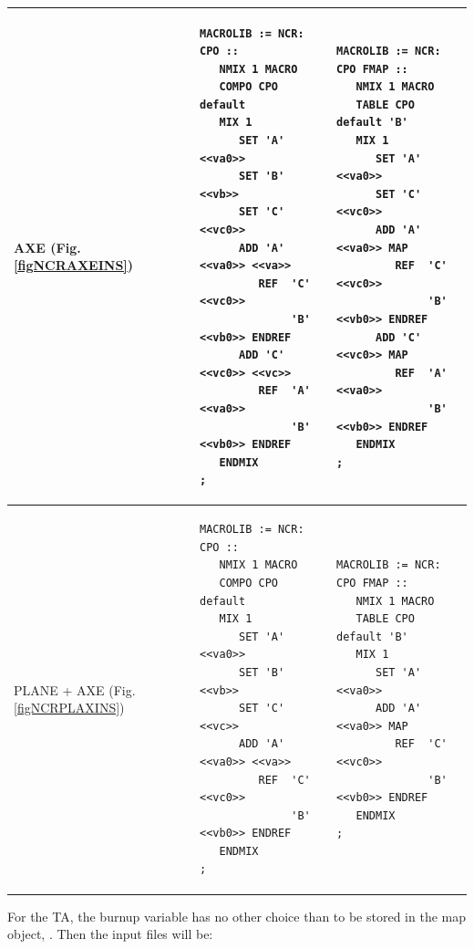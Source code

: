 \begin{center}
\begin{supertabular}{|p{0.1\textwidth}|p{0.4\textwidth}|p{0.4\textwidth}|}
AXE (Fig. \ref{figNCRAXEINS}) & 
\begin{verbatim}
MACROLIB := NCR: CPO ::
   NMIX 1 MACRO 
   COMPO CPO default
   MIX 1 
      SET 'A' <<va0>>
      SET 'B' <<vb>>
      SET 'C' <<vc0>>
      ADD 'A' <<va0>> <<va>>
         REF  'C' <<vc0>> 
              'B' <<vb0>> ENDREF
      ADD 'C' <<vc0>> <<vc>>
         REF  'A' <<va0>> 
              'B' <<vb0>> ENDREF
   ENDMIX
;
\end{verbatim} &
\begin{verbatim}
MACROLIB := NCR: CPO FMAP ::
   NMIX 1 MACRO 
   TABLE CPO default 'B' 
   MIX 1 
      SET 'A' <<va0>>
      SET 'C' <<vc0>>
      ADD 'A' <<va0>> MAP
         REF  'C' <<vc0>> 
              'B' <<vb0>> ENDREF
      ADD 'C' <<vc0>> MAP
         REF  'A' <<va0>> 
              'B' <<vb0>> ENDREF
   ENDMIX
;
\end{verbatim} \\
\hline
PLANE + AXE (Fig. \ref{figNCRPLAXINS}) & 
\begin{verbatim}
MACROLIB := NCR: CPO ::
   NMIX 1 MACRO 
   COMPO CPO default
   MIX 1 
      SET 'A' <<va0>>
      SET 'B' <<vb>>
      SET 'C' <<vc>>
      ADD 'A' <<va0>> <<va>>
         REF  'C' <<vc0>> 
              'B' <<vb0>> ENDREF
   ENDMIX
;
\end{verbatim} &
\begin{verbatim}
MACROLIB := NCR: CPO FMAP ::
   NMIX 1 MACRO 
   TABLE CPO default 'B' 
   MIX 1 
      SET 'A' <<va0>>
      ADD 'A' <<va0>> MAP
         REF  'C' <<vc0>> 
              'B' <<vb0>> ENDREF
   ENDMIX
;
\end{verbatim} \\
\hline
\end{supertabular}
\end{center}

For the TA, the burnup variable has no other choice than to be stored in the {\sc map} object, . Then the input files will be: \\

